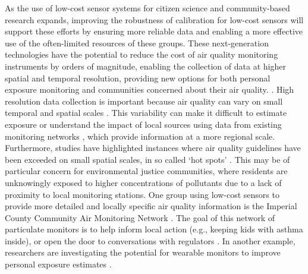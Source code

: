 \documentclass[journal abbreviation, manuscript]{copernicus}
\begin{document}
As the use of low-cost sensor systems for citizen science and community-based research expands, improving the robustness of calibration for low-cost sensors will support these efforts by ensuring more reliable data and enabling a more effective use of the often-limited resources of these groups. These next-generation technologies have the potential to reduce the cost of air quality monitoring instruments by orders of magnitude, enabling the collection of data at higher spatial and temporal resolution, providing new options for both personal exposure monitoring and communities concerned about their air quality. \citep{Snyder2013}.  High resolution data collection is important because air quality can vary on small temporal and spatial scales \citep{Monn1997, Wheeler2008}. This variability can make it difficult to estimate exposure or understand the impact of local sources using data from existing monitoring networks \citep{Wilson2005}, which provide information at a more regional scale. Furthermore, studies have highlighted instances where air quality guidelines have been exceeded on small spatial scales, in so called ‘hot spots’ \citep{Wu2012}. This may be of particular concern for environmental justice communities, where residents are unknowingly exposed to higher concentrations of pollutants due to a lack of proximity to local monitoring stations. One group using low-cost sensors to provide more detailed and locally specific air quality information is the Imperial County Community Air Monitoring Network \citep{English2016}. The goal of this network of particulate monitors is to help inform local action (e.g., keeping kids with asthma inside), or open the door to conversations with regulators \citep{English2016}. In another example, researchers are investigating the potential for wearable monitors to improve personal exposure estimates \citep{Jerrett2017}. 

\end{document}
